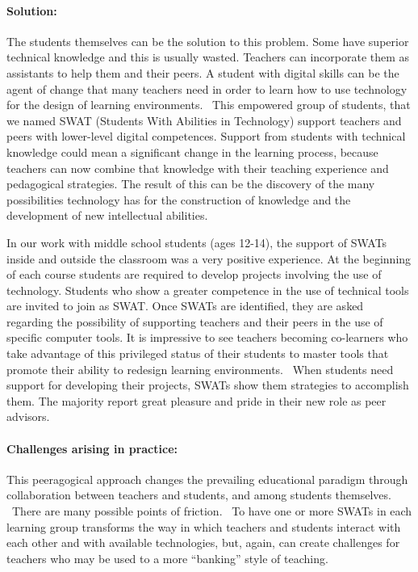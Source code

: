 \paragraph{Solution:}
The students themselves can be the solution to this problem. Some have
superior technical knowledge and this is usually wasted. Teachers can
incorporate them as assistants to help them and their peers. A student
with digital skills can be the agent of change that many teachers need
in order to learn how to use technology for the design of learning
environments. ~This empowered group of students, that we named SWAT
(Students With Abilities in Technology) support teachers and peers with
lower-level digital competences. Support from students with technical
knowledge could mean a significant change in the learning process,
because teachers can now combine that knowledge with their teaching
experience and pedagogical strategies. The result of this can be the
discovery of the many possibilities technology has for the construction
of knowledge and the development of new intellectual abilities.

In our work with middle school students (ages 12-14), the support of
SWATs inside and outside the classroom was a very positive experience.
At the beginning of each course students are required to develop
projects involving the use of technology. Students who show a greater
competence in the use of technical tools are invited to join as SWAT.
Once SWATs are identified, they are asked regarding the possibility of
supporting teachers and their peers in the use of specific computer
tools. It is impressive to see teachers becoming co-learners who take
advantage of this privileged status of their students to master tools
that promote their ability to redesign learning environments. ~When
students need support for developing their projects, SWATs show them
strategies to accomplish them. The majority report great pleasure and
pride in their new role as peer advisors.

\paragraph{Challenges arising in practice:}

This peeragogical approach changes the prevailing educational paradigm
through collaboration between teachers and students, and among students
themselves. ~There are many possible points of friction. ~To have one or
more SWATs in each learning group transforms the way in which teachers
and students interact with each other and with available technologies,
but, again, can create challenges for teachers who may be used to a more
``banking'' style of teaching.

